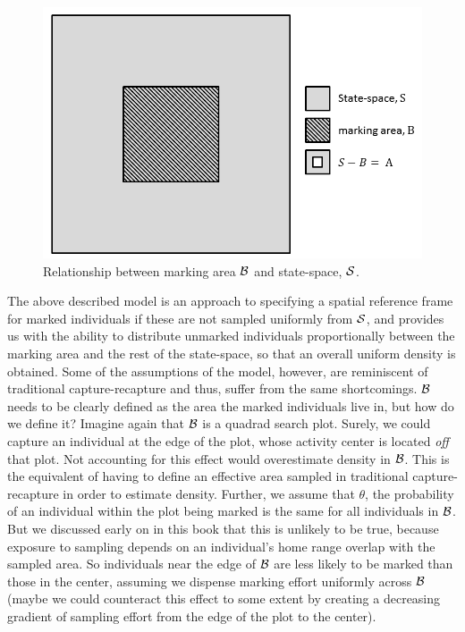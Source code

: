 \begin{figure}[ht]
\begin{center}
\includegraphics[width=5in]{Ch19-PartialID/figs/scrPIDBox.png}
\end{center}
\caption{
Relationship between marking area ${\cal B}$ and state-space, ${\cal S}$.
}
\label{partialID.fig.Box}
\end{figure}

The above described model is an approach to specifying a spatial reference frame for marked individuals if these are not sampled uniformly from ${\cal S}$, and provides us with the ability to distribute unmarked individuals proportionally between the marking area and the rest of the state-space, so that an overall uniform density is obtained. Some of the assumptions of the model, however, are reminiscent of traditional capture-recapture and thus, suffer from the same shortcomings. ${\cal B}$ needs to be clearly defined as the area the marked individuals live in, but how do we define it? Imagine again that ${\cal B}$ is a quadrad search plot. Surely, we could capture an individual at the edge of the plot, whose activity center is located \emph{off} that plot. Not accounting for this effect would overestimate density in ${\cal B}$. This is the equivalent of  having to define an effective area sampled in traditional capture-recapture in order to estimate density. Further, we assume that $\theta$, the probability of an individual within the plot being marked is the same for all individuals in ${\cal B}$. But we discussed early on in this book that this is unlikely to be true, because exposure to sampling depends on an individual's home range overlap with the sampled area. So individuals near the edge of ${\cal B}$ are less likely to be marked than those in the center, assuming we dispense marking effort uniformly across ${\cal B}$ (maybe we could counteract this effect to some extent by creating a decreasing gradient of sampling effort from the edge of the plot to the center).

